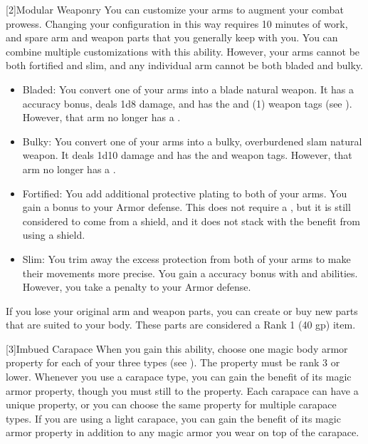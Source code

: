     [2]{Modular Weaponry} You can customize your arms to augment your combat prowess.
      Changing your configuration in this way requires 10 minutes of work, and spare arm and weapon parts that you generally keep with you.
      You can combine multiple customizations with this ability.
      However, your arms cannot be both fortified and slim, and any individual arm cannot be both bladed and bulky.
      \begin{itemize}
        \item Bladed: You convert one of your arms into a blade natural weapon.
          It has a  accuracy bonus, deals 1d8 damage, and has the  and  (1) weapon tags (see ).
          However, that arm no longer has a .
        \item Bulky: You convert one of your arms into a bulky, overburdened slam natural weapon.
          It deals 1d10 damage and has the  and  weapon tags.
          However, that arm no longer has a .
        \item Fortified: You add additional protective plating to both of your arms.
          You gain a  bonus to your Armor defense.
          This does not require a , but it is still considered to come from a shield, and it does not stack with the benefit from using a shield.
        \item Slim: You trim away the excess protection from both of your arms to make their movements more precise.
          You gain a  accuracy bonus with  and \atBrawling abilities.
          However, you take a  penalty to your Armor defense.
      \end{itemize}

      If you lose your original arm and weapon parts, you can create or buy new parts that are suited to your body.
      These parts are considered a Rank 1 (40 gp) item.

    [3]{Imbued Carapace} When you gain this ability, choose one magic body armor property for each of your three  types (see ).
      The property must be rank 3 or lower.
      Whenever you use a carapace type, you can gain the benefit of its magic armor property, though you must still  to the property.
      Each carapace can have a unique property, or you can choose the same property for multiple carapace types.
      If you are using a light carapace, you can gain the benefit of its magic armor property in addition to any magic armor you wear on top of the carapace.

